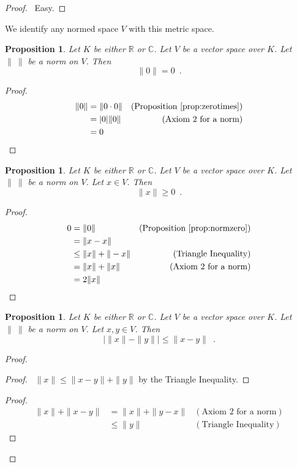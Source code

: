 \documentclass{book}
\let\qed\relax
\newtheorem{prop}[ax]{Proposition}
\theoremstyle{definition}
\begin{document}
\begin{proof}
\pf\ Easy. \qed
\end{proof}

We identify any normed space $V$ with this metric space.

\begin{prop}
\label{prop:normzero}
Let $K$ be either $\mathbb{R}$ or $\mathbb{C}$. Let $V$ be a vector space over $K$. Let $\|\ \|$ be a norm on $V$. Then
\[ \| 0 \| = 0 \enspace . \]
\end{prop}

\begin{proof}
\pf
\begin{align*}
\| 0 \| & = \| 0 \cdot 0 \| & (\text{Proposition \ref{prop:zerotimes}}) \\
& = |0| \| 0 \| & (\text{Axiom 2 for a norm}) \\
& = 0 & \qed
\end{align*}
\end{proof}

\begin{prop}
Let $K$ be either $\mathbb{R}$ or $\mathbb{C}$. Let $V$ be a vector space over $K$. Let $\|\ \|$ be a norm on $V$. Let $x \in V$. Then
\[ \| x \| \geq 0 \enspace . \]
\end{prop}

\begin{proof}
\pf
\begin{align*}
0 & = \| 0 \| &  (\text{Proposition \ref{prop:normzero}}) \\
& = \| x - x \| \\
& \leq \| x \| + \| - x \| & (\text{Triangle Inequality}) \\
& = \| x \| + \| x \| & (\text{Axiom 2 for a norm}) \\
& = 2 \| x\| & \qed
\end{align*}
\end{proof}

\begin{prop}
\label{prop:distancebetweennorms}
Let $K$ be either $\mathbb{R}$ or $\mathbb{C}$. Let $V$ be a vector space over $K$. Let $\|\ \|$ be a norm on $V$. Let $x,y \in V$. Then
\[ | \| x \| - \| y \| | \leq \| x - y \| \enspace . \]
\end{prop}

\begin{proof}
\pf
{}
\begin{proof}
	\pf\ $\|x\| \leq \| x - y \| + \|y \|$ by the Triangle Inequality.
\end{proof}
\begin{proof}
	\pf
	\begin{align*}
		\| x \| + \| x - y \| & = \| x \| + \| y - x\| & (\text{Axiom 2 for a norm}) \\
		& \leq \| y \| & (\text{Triangle Inequality})
	\end{align*}
\end{proof}
\qed
\end{proof}
\end{document}
